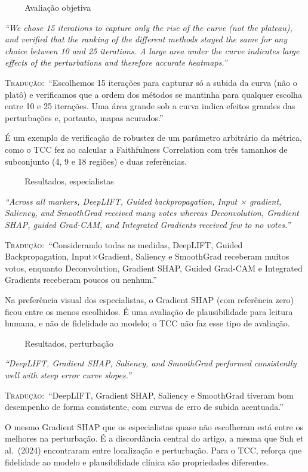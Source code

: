 \documentclass[11pt,a4paper]{article}
\newcommand{\pagechip}[1]{{\setlength{\fboxsep}{1.5pt}\colorbox{cAcc}{\textcolor{white}{\scriptsize\texttt{#1}}}}}
\newenvironment{origquote}{\par\itshape\small}{\par}
\newenvironment{tradquote}{\par\small\textsc{Tradução:}\ }{\par}
\newcommand{\explab}[1]{\par\smallskip{\small\color{cAcc}\textbf{\MakeUppercase{#1}}}\par}
\begin{document}
\begin{citacard}{\pagechip{p. 4} Avaliação objetiva}
\begin{origquote}“We chose 15 iterations to capture only the rise of the curve (not the plateau), and verified that the ranking of the different methods stayed the same for any choice between 10 and 25 iterations. A large area under the curve indicates large effects of the perturbations and therefore accurate heatmaps.”\end{origquote}
\begin{tradquote}“Escolhemos 15 iterações para capturar só a subida da curva (não o platô) e verificamos que a ordem dos métodos se mantinha para qualquer escolha entre 10 e 25 iterações. Uma área grande sob a curva indica efeitos grandes das perturbações e, portanto, mapas acurados.”\end{tradquote}
\explab{Explicação}
É um exemplo de verificação de robustez de um parâmetro arbitrário da métrica, como o TCC fez ao calcular a Faithfulness Correlation com três tamanhos de subconjunto (4, 9 e 18 regiões) e duas referências.
\end{citacard}

\begin{citacard}{\pagechip{p. 5} Resultados, especialistas}
\begin{origquote}“Across all markers, DeepLIFT, Guided backpropagation, Input × gradient, Saliency, and SmoothGrad received many votes whereas Deconvolution, Gradient SHAP, guided Grad-CAM, and Integrated Gradients received few to no votes.”\end{origquote}
\begin{tradquote}“Considerando todas as medidas, DeepLIFT, Guided Backpropagation, Input×Gradient, Saliency e SmoothGrad receberam muitos votos, enquanto Deconvolution, Gradient SHAP, Guided Grad-CAM e Integrated Gradients receberam poucos ou nenhum.”\end{tradquote}
\explab{Explicação}
Na preferência visual dos especialistas, o Gradient SHAP (com referência zero) ficou entre os menos escolhidos. É uma avaliação de plausibilidade para leitura humana, e não de fidelidade ao modelo; o TCC não faz esse tipo de avaliação.
\end{citacard}

\begin{citacard}{\pagechip{p. 5} Resultados, perturbação}
\begin{origquote}“DeepLIFT, Gradient SHAP, Saliency, and SmoothGrad performed consistently well with steep error curve slopes.”\end{origquote}
\begin{tradquote}“DeepLIFT, Gradient SHAP, Saliency e SmoothGrad tiveram bom desempenho de forma consistente, com curvas de erro de subida acentuada.”\end{tradquote}
\explab{Explicação}
O mesmo Gradient SHAP que os especialistas quase não escolheram está entre os melhores na perturbação. É a discordância central do artigo, a mesma que Suh et al.\ (2024) encontraram entre localização e perturbação. Para o TCC, reforça que fidelidade ao modelo e plausibilidade clínica são propriedades diferentes.
\end{citacard}
\end{document}
